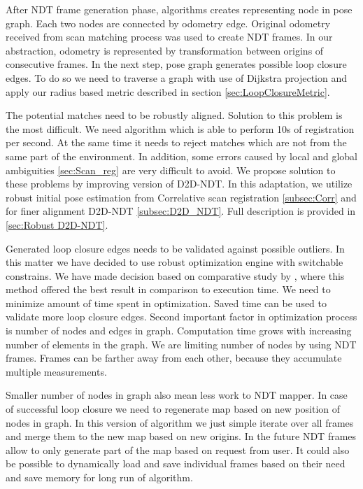 After \gls{NDT} frame generation phase, algorithms creates representing node in pose graph. Each two nodes are connected by odometry edge. Original odometry received from scan matching process was used to create \gls{NDT} frames. In our abstraction, odometry is represented by transformation between origins of consecutive frames. In the next step, pose graph generates possible loop closure edges. To do so we need to traverse a graph with use of Dijkstra projection and apply our radius based metric described in section \ref{sec:LoopClosureMetric}. 

The potential matches need to be robustly aligned. Solution to this problem is the most difficult. We need algorithm which is able to perform 10s of registration per second. At the same time it needs to reject matches which are not from the same part of the environment. In addition, some errors caused by local and global ambiguities \ref{sec:Scan_reg} are very difficult to avoid. We propose solution to these problems by improving version of \gls{D2D}-\gls{NDT}. In this adaptation, we utilize robust initial pose estimation from Correlative scan registration \ref{subsec:Corr} and for finer alignment \gls{D2D}-\gls{NDT} \ref{subsec:D2D_NDT}. Full description is provided in \ref{sec:Robust D2D-NDT}.

Generated loop closure edges needs to be validated against possible outliers. In this matter we have decided to use robust optimization engine with switchable constrains. We have made decision based on comparative study by \cite{RobustOpt}, where this method offered the best result in comparison to execution time. We need to minimize amount of time spent in optimization. Saved time can be used to validate more loop closure edges. Second important factor in optimization process is number of nodes and edges in graph. Computation time grows with increasing number of elements in the graph. We are limiting number of nodes by using \gls{NDT} frames. Frames can be farther away from each other, because they accumulate multiple measurements.

Smaller number of nodes in graph also mean less work to \gls{NDT} mapper. In case of successful loop closure we need to regenerate map based on new position of nodes in graph. In this version of algorithm we just simple iterate over all frames and merge them to the new map based on new origins. In the future \gls{NDT} frames allow to only generate part of the map based on request from user. It could also be possible to dynamically load and save individual frames based on their need and save memory for long run of algorithm.

